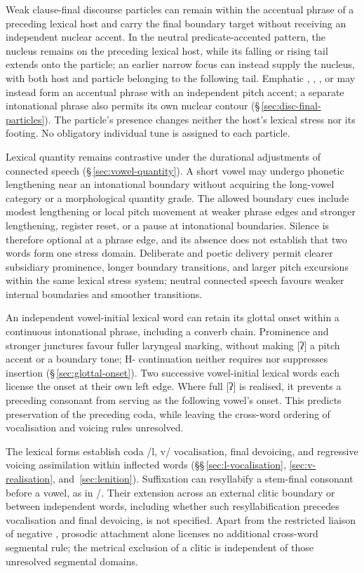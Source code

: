 Weak clause-final discourse particles can remain within the accentual
phrase of a preceding lexical host and carry the final boundary target
without receiving an independent nuclear accent. In the neutral
predicate-accented pattern, the nucleus remains on the preceding lexical
host, while its falling or rising tail extends onto the particle; an
earlier narrow focus can instead supply the nucleus, with both host and
particle belonging to the following tail. Emphatic , , , or  may
instead form an accentual phrase with an independent pitch accent; a
separate intonational phrase also permits its own nuclear contour
(§\,\ref{sec:disc-final-particles}). The particle's presence changes
neither the host's lexical stress nor its footing. No obligatory individual
tune is assigned to each particle.

Lexical quantity remains contrastive under the durational adjustments of
connected speech (§\,\ref{sec:vowel-quantity}). A short vowel may undergo
phonetic lengthening near an intonational boundary without acquiring the
long-vowel category or a morphological quantity grade. The allowed
boundary cues include modest lengthening or local pitch movement at weaker
phrase edges and stronger lengthening, register reset, or a pause at
intonational boundaries. Silence is therefore optional at a phrase edge,
and its absence does not establish that two words form one stress domain.
Deliberate and poetic delivery permit clearer subsidiary prominence,
longer boundary transitions, and larger pitch excursions within the same
lexical stress system; neutral connected speech favours weaker internal
boundaries and smoother transitions.

An independent vowel-initial lexical word can retain its glottal onset
within a continuous intonational phrase, including a converb chain.
Prominence and stronger junctures favour fuller laryngeal marking, without
making [ʔ] a pitch accent or a boundary tone; H- continuation neither
requires nor suppresses insertion (§\,\ref{sec:glottal-onset}). Two
successive vowel-initial lexical words each license the onset at their own
left edge. Where full [ʔ] is realised, it prevents a preceding consonant
from serving as the following vowel's onset. This predicts preservation of
the preceding coda, while leaving the cross-word ordering of vocalisation
and voicing rules unresolved.

The lexical forms establish coda /l, v/ vocalisation, final devoicing, and
regressive voicing assimilation within inflected words
(§§\,\ref{sec:l-vocalisation}, \ref{sec:v-realisation}, and~\ref{sec:lenition}).
Suffixation can resyllabify a stem-final consonant before a vowel, as in
/. Their extension across an external clitic boundary
or between independent words, including whether such resyllabification
precedes vocalisation and final devoicing, is not specified. Apart from the
restricted liaison of negative , prosodic attachment alone
licenses no additional cross-word segmental rule;
the metrical exclusion of a clitic is independent of those unresolved
segmental domains.


